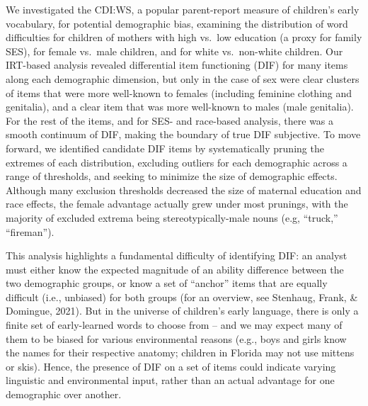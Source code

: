 \documentclass[10pt, letterpaper]{article}
\begin{document}
We investigated the CDI:WS, a popular parent-report measure of
children's early vocabulary, for potential demographic bias, examining
the distribution of word difficulties for children of mothers with high
vs.~low education (a proxy for family SES), for female vs.~male
children, and for white vs.~non-white children. Our IRT-based analysis
revealed differential item functioning (DIF) for many items along each
demographic dimension, but only in the case of sex were clear clusters
of items that were more well-known to females (including feminine
clothing and genitalia), and a clear item that was more well-known to
males (male genitalia). For the rest of the items, and for SES- and
race-based analysis, there was a smooth continuum of DIF, making the
boundary of true DIF subjective. To move forward, we identified
candidate DIF items by systematically pruning the extremes of each
distribution, excluding outliers for each demographic across a range of
thresholds, and seeking to minimize the size of demographic effects.
Although many exclusion thresholds decreased the size of maternal
education and race effects, the female advantage actually grew under
most prunings, with the majority of excluded extrema being
stereotypically-male nouns (e.g, ``truck,'' ``fireman'').

This analysis highlights a fundamental difficulty of identifying DIF: an
analyst must either know the expected magnitude of an ability difference
between the two demographic groups, or know a set of ``anchor'' items
that are equally difficult (i.e., unbiased) for both groups (for an
overview, see Stenhaug, Frank, \& Domingue, 2021). But in the universe
of children's early language, there is only a finite set of
early-learned words to choose from -- and we may expect many of them to
be biased for various environmental reasons (e.g., boys and girls know
the names for their respective anatomy; children in Florida may not use
mittens or skis). Hence, the presence of DIF on a set of items could
indicate varying linguistic and environmental input, rather than an
actual advantage for one demographic over another.
\end{document}
